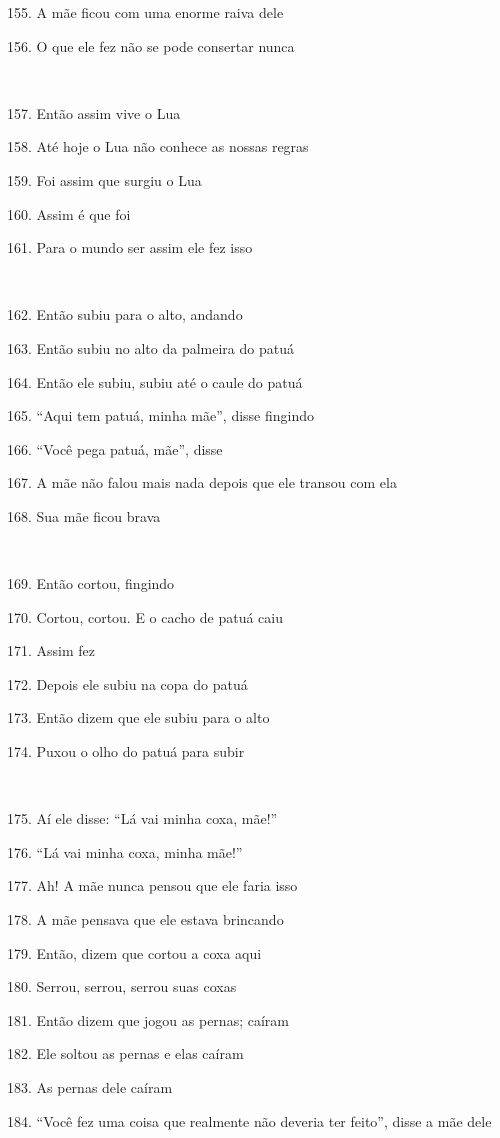 155. A mãe ficou com uma enorme raiva dele

156. O que ele fez não se pode consertar nunca

~

157. Então assim vive o Lua

158. Até hoje o Lua não conhece as nossas regras

159. Foi assim que surgiu o Lua

160. Assim é que foi

161. Para o mundo ser assim ele fez isso

~

162. Então subiu para o alto, andando

163. Então subiu no alto da palmeira do patuá

164. Então ele subiu, subiu até o caule do patuá

165. ``Aqui tem patuá, minha mãe'', disse fingindo

166. ``Você pega patuá, mãe'', disse

167. A mãe não falou mais nada depois que ele transou com ela

168. Sua mãe ficou brava

~

169. Então cortou, fingindo

170. Cortou, cortou. E o cacho de patuá caiu

171. Assim fez

172. Depois ele subiu na copa do patuá

173. Então dizem que ele subiu para o alto

174. Puxou o olho do patuá para subir

~

175. Aí ele disse: ``Lá vai minha coxa, mãe!''

176. ``Lá vai minha coxa, minha mãe!''

177. Ah! A mãe nunca pensou que ele faria isso

178. A mãe pensava que ele estava brincando

179. Então, dizem que cortou a coxa aqui

180. Serrou, serrou, serrou suas coxas

181. Então dizem que jogou as pernas; caíram

182. Ele soltou as pernas e elas caíram

183. As pernas dele caíram

184. ``Você fez uma coisa que realmente não deveria ter feito'', disse a
mãe dele

